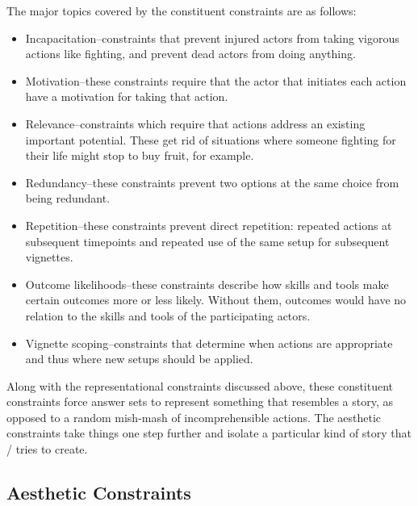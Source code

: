 The major topics covered by the constituent constraints are as follows:
%
\begin{itemize}
  \item Incapacitation--constraints that prevent injured actors from taking vigorous actions like fighting, and prevent dead actors from doing anything.
  \item Motivation--these constraints require that the actor that initiates each action have a motivation for taking that action.
  \item Relevance--constraints which require that actions address an existing important potential. These get rid of situations where someone fighting for their life might stop to buy fruit, for example.
  \item Redundancy--these constraints prevent two options at the same choice from being redundant.
  \item Repetition--these constraints prevent direct repetition: repeated actions at subsequent timepoints and repeated use of the same setup for subsequent vignettes.
  \item Outcome likelihoods--these constraints describe how skills and tools make certain outcomes more or less likely. Without them, outcomes would have no relation to the skills and tools of the participating actors.
  \item Vignette scoping--constraints that determine when  actions are appropriate and thus where new setups should be applied.
\end{itemize}
%
Along with the representational constraints discussed above, these constituent constraints force answer sets to represent something that resembles a story, as opposed to a random mish-mash of incomprehensible actions.
%
The aesthetic constraints take things one step further and isolate a particular kind of story that \dunyazad/ tries to create.

\subsection{Aesthetic Constraints}


